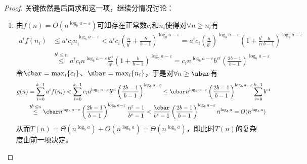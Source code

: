 \documentclass{ctexart}
\begin{document}
\begin{proof}
    关键依然是后面求和这一项，继续分情况讨论：
    \begin{enumerate}
        \item 由$f(n) = O(n^{\log_b a - \varepsilon})$可知存在正常数$c_i$和$n_i$使得对$\forall n \ge n_i$有
              \begin{align*}
                  a^i f(n_i) & \le a^i c_i n_i^{\log_b a - \varepsilon} < a^i c_i \left( \frac{n}{b^i} + \frac{b}{b-1} \right)^{\log_b a - \varepsilon} = a^i c_i \left( \frac{n}{b^i} \right)^{\log_b a - \varepsilon} \left( 1 + \frac{b^i}{n} \frac{b}{b-1} \right)^{\log_b a - \varepsilon} \\
                             & \overset{b^i \le n}{\le} a^i c_i n^{\log_b a - \varepsilon} \frac{b^{\varepsilon i}}{a^i} \left( 1 + \frac{b}{b-1} \right)^{\log_b a - \varepsilon} = c_i n^{\log_b a - \varepsilon} b^{\varepsilon i} \left( \frac{2b-1}{b-1} \right)^{\log_b a - \varepsilon}
              \end{align*}
              令$\cbar = \max_i \{c_i\}$、$\nbar = \max_i \{n_i\}$，于是对$\forall n \ge \nbar$有
              \begin{align*}
                  g(n) & = \sum_{i=0}^{k-1} a^i f(n_i) < \sum_{i=0}^{k-1} c_i n^{\log_b a - \varepsilon} b^{\varepsilon i} \left( \frac{2b-1}{b-1} \right)^{\log_b a - \varepsilon} \le \cbar n^{\log_b a - \varepsilon} \left( \frac{2b-1}{b-1} \right)^{\log_b a - \varepsilon} \sum_{i=0}^{k-1} b^{\varepsilon i} \\
                       & \overset{b^k \le n}{\le} \cbar n^{\log_b a - \varepsilon} \left( \frac{2b-1}{b-1} \right)^{\log_b a - \varepsilon} \frac{n^\varepsilon - 1}{b^\varepsilon - 1} < \frac{\cbar}{b^\varepsilon - 1} \left( \frac{2b-1}{b-1} \right)^{\log_b a - \varepsilon} n^{\log_b a} = O(n^{\log_b a})
              \end{align*}
              从而$T(n) = \Theta(n^{\log_b a}) + O(n^{\log_b a}) = \Theta(n^{\log_b a})$，即此时$T(n)$的复杂度由前一项决定。


\end{enumerate}
\end{proof}
\end{document}
